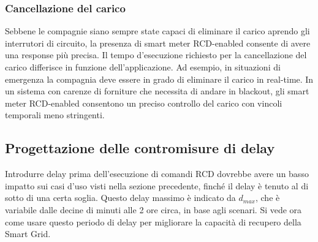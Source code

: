 \subsubsection{Cancellazione del carico}
Sebbene le compagnie siano sempre state capaci di eliminare il carico aprendo gli interrutori di circuito, la presenza di smart meter RCD-enabled consente di avere una response più precisa. Il tempo d'esecuzione richiesto per la cancellazione del carico differisce in funzione dell'applicazione. Ad esempio, in situazioni di emergenza la compagnia deve essere in grado di eliminare il carico in real-time. In un sistema con carenze di forniture che necessita di andare in blackout, gli smart meter RCD-enabled consentono un preciso controllo del carico con vincoli temporali meno stringenti.
\subsection{Progettazione delle contromisure di delay}
Introdurre delay prima dell'esecuzione di comandi RCD dovrebbe avere un basso impatto sui casi d'uso visti nella sezione precedente, finché il delay è tenuto al di sotto di una certa soglia. Questo delay massimo è indicato da $d_{max}$, che è variabile dalle decine di minuti alle 2 ore circa, in base agli scenari. Si vede ora come usare questo periodo di delay per migliorare la capacità di recupero della Smart Grid.\\
